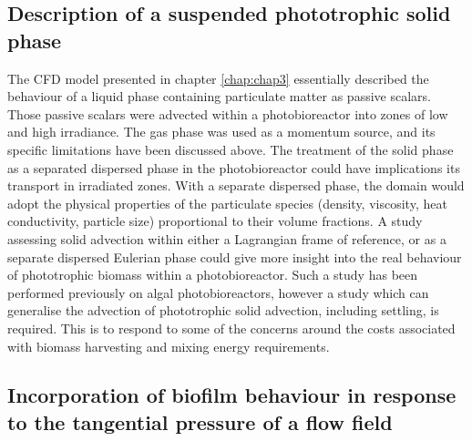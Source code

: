 \subsection{Description of a suspended phototrophic solid phase}
The CFD model presented in chapter \ref{chap:chap3} essentially described the behaviour of a liquid phase containing particulate matter as passive scalars. Those passive scalars were advected within a photobioreactor into zones of low and high irradiance. The gas phase was used as a momentum source, and its specific limitations have been discussed above. The treatment of the solid phase as a separated dispersed phase in the photobioreactor could have implications its transport in irradiated zones. With a separate dispersed phase, the domain would adopt the physical properties of the particulate species (density, viscosity, heat conductivity, particle size) proportional to their volume fractions. A study assessing solid advection within either a Lagrangian frame of reference, or as a separate dispersed Eulerian phase could give more insight into the real behaviour of phototrophic biomass within a photobioreactor. Such a study has been performed previously \cite{gao2016} on algal photobioreactors, however a study which can generalise the advection of phototrophic solid advection, including settling, is required. This is to respond to some of the concerns around the costs associated with biomass harvesting and mixing energy requirements. 

\subsection{Incorporation of biofilm behaviour in response to the tangential pressure of a flow field}


